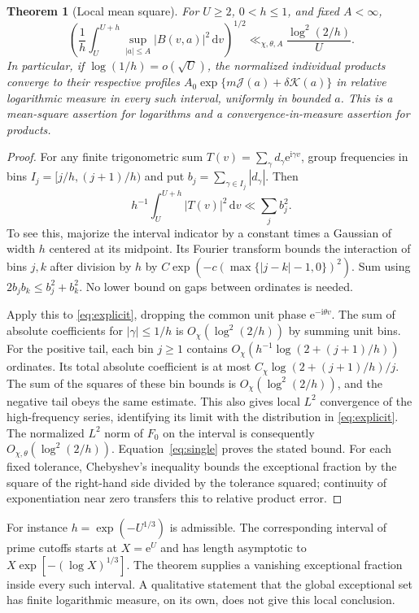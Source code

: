 \documentclass[11pt]{article}
\newtheorem{theorem}{Theorem}
\newcommand{\dd}{\,\mathrm d}
\newcommand{\e}{\mathrm e}
\newcommand{\ii}{\mathrm i}
\newcommand{\J}{\mathcal J}
\newcommand{\K}{\mathcal K}
\begin{document}
\begin{theorem}[Local mean square]\label{thm:ms}
For $U\ge2$, $0<h\le1$, and fixed $A<\infty$,
\[
 \left(\frac1h\int_U^{U+h}\sup_{|a|\le A}|B(v,a)|^2\dd v\right)^{1/2}
 \ll_{\chi,\theta,A}\frac{\log^2(2/h)}{U}.
\]
In particular, if $\log(1/h)=o(\sqrt U)$, the normalized individual products converge to their respective profiles
$A_0\exp\{m\J(a)+\delta\K(a)\}$ in relative logarithmic measure in every such interval, uniformly in bounded $a$. This is a mean-square assertion for logarithms and a convergence-in-measure assertion for products.
\end{theorem}
\begin{proof}
For any finite trigonometric sum $T(v)=\sum_\gamma d_\gamma\e^{\ii\gamma v}$, group frequencies in bins $I_j=[j/h,(j+1)/h)$ and put $b_j=\sum_{\gamma\in I_j}|d_\gamma|$. Then
\[
 h^{-1}\int_U^{U+h}|T(v)|^2\dd v\ll\sum_j b_j^2 .
\]
To see this, majorize the interval indicator by a constant times a Gaussian of width $h$ centered at its midpoint. Its Fourier transform bounds the interaction of bins $j,k$ after division by $h$ by $C\exp(-c(\max\{|j-k|-1,0\})^2)$. Sum using $2b_jb_k\le b_j^2+b_k^2$. No lower bound on gaps between ordinates is needed.

Apply this to \eqref{eq:explicit}, dropping the common unit phase $\e^{-\ii\theta v}$. The sum of absolute coefficients for $|\gamma|\le 1/h$ is $O_\chi(\log^2(2/h))$ by summing unit bins. For the positive tail, each bin $j\ge1$ contains $O_\chi(h^{-1}\log(2+(j+1)/h))$ ordinates. Its total absolute coefficient is at most $C_\chi\log(2+(j+1)/h)/j$. The sum of the squares of these bin bounds is $O_\chi(\log^2(2/h))$, and the negative tail obeys the same estimate. This also gives local $L^2$ convergence of the high-frequency series, identifying its limit with the distribution in \eqref{eq:explicit}. The normalized $L^2$ norm of $F_0$ on the interval is consequently $O_{\chi,\theta}(\log^2(2/h))$. Equation~\eqref{eq:single} proves the stated bound. For each fixed tolerance, Chebyshev's inequality bounds the exceptional fraction by the square of the right-hand side divided by the tolerance squared; continuity of exponentiation near zero transfers this to relative product error.
\end{proof}
For instance $h=\exp(-U^{1/3})$ is admissible. The corresponding interval of prime cutoffs starts at $X=\e^U$ and has length asymptotic to $X\exp[-(\log X)^{1/3}]$. The theorem supplies a vanishing exceptional fraction inside every such interval. A qualitative statement that the global exceptional set has finite logarithmic measure, on its own, does not give this local conclusion.
\end{document}
